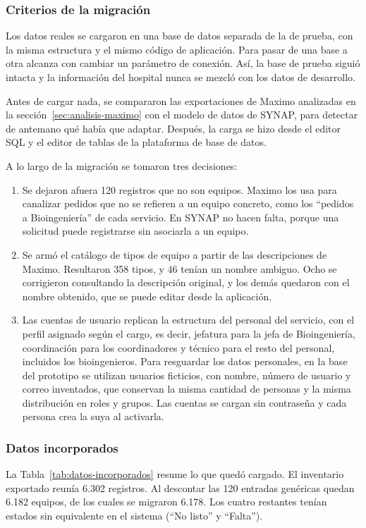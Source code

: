 \documentclass[10pt]{article}
\begin{document}
\subsubsection{Criterios de la migración}
Los datos reales se cargaron en una base de datos separada de la de prueba, con la misma estructura y el mismo código de aplicación. Para pasar de una base a otra alcanza con cambiar un parámetro de conexión. Así, la base de prueba siguió intacta y la información del hospital nunca se mezcló con los datos de desarrollo.

Antes de cargar nada, se compararon las exportaciones de Maximo analizadas en la sección~\ref{sec:analisis-maximo} con el modelo de datos de SYNAP, para detectar de antemano qué había que adaptar. Después, la carga se hizo desde el editor SQL y el editor de tablas de la plataforma de base de datos.

A lo largo de la migración se tomaron tres decisiones:

\begin{enumerate}
    \item Se dejaron afuera 120 registros que no son equipos. Maximo los usa para canalizar pedidos que no se refieren a un equipo concreto, como los “pedidos a Bioingeniería” de cada servicio. En SYNAP no hacen falta, porque una solicitud puede registrarse sin asociarla a un equipo.
    \item Se armó el catálogo de tipos de equipo a partir de las descripciones de Maximo. Resultaron 358 tipos, y 46 tenían un nombre ambiguo. Ocho se corrigieron consultando la descripción original, y los demás quedaron con el nombre obtenido, que se puede editar desde la aplicación.
    \item Las cuentas de usuario replican la estructura del personal del servicio, con el perfil asignado según el cargo, es decir, jefatura para la jefa de Bioingeniería, coordinación para los coordinadores y técnico para el resto del personal, incluidos los bioingenieros. Para resguardar los datos personales, en la base del prototipo se utilizan usuarios ficticios, con nombre, número de usuario y correo inventados, que conservan la misma cantidad de personas y la misma distribución en roles y grupos. Las cuentas se cargan sin contraseña y cada persona crea la suya al activarla.
\end{enumerate}

\subsubsection{Datos incorporados}
La Tabla~\ref{tab:datos-incorporados} resume lo que quedó cargado. El inventario exportado reunía 6.302 registros. Al descontar las 120 entradas genéricas quedan 6.182 equipos, de los cuales se migraron 6.178. Los cuatro restantes tenían estados sin equivalente en el sistema (“No listo” y “Falta”).
\end{document}

